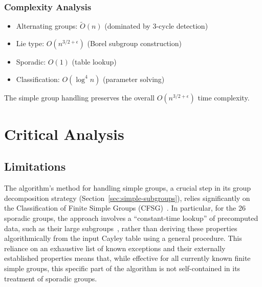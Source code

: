 \documentclass[sigconf]{acmart}
\begin{document}
\subsubsection{Complexity Analysis}
\begin{itemize}
    \item Alternating groups: $\widetilde{O}(n)$ (dominated by 3-cycle detection)
    \item Lie type: $O(n^{3/2+\epsilon})$ (Borel subgroup construction)
    \item Sporadic: $O(1)$ (table lookup)
    \item Classification: $O(\log^4 n)$ (parameter solving)
\end{itemize}

\begin{lemma}
The simple group handling preserves the overall $O(n^{3/2+\epsilon})$ time complexity.
\end{lemma}

\section{Critical Analysis}

\subsection{Limitations}

The algorithm's method for handling simple groups, a crucial step in its group decomposition strategy (Section~\ref{sec:simple-subgroups}), relies significantly on the Classification of Finite Simple Groups (CFSG)~\cite{Aschbacher2004Notices}. In particular, for the 26 sporadic groups, the approach involves a ``constant-time lookup'' of precomputed data, such as their large subgroups~\cite{Conway1985Atlas, Wilson2009Simple}, rather than deriving these properties algorithmically from the input Cayley table using a general procedure. This reliance on an exhaustive list of known exceptions and their externally established properties means that, while effective for all currently known finite simple groups, this specific part of the algorithm is not self-contained in its treatment of sporadic groups. 
\end{document}
